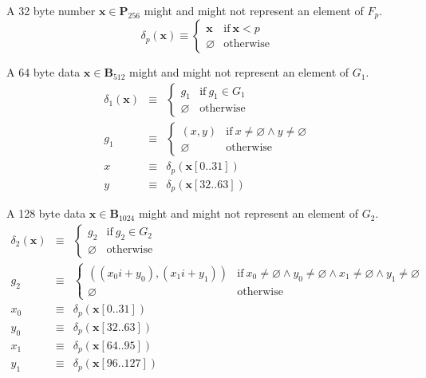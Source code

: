 \documentclass[9pt,oneside]{amsart}
\begin{document}
A 32 byte number $\mathbf{x}\in\mathbf{P}_{256}$ might and might not represent an element of $F_p$.
\begin{equation}
\delta_p(\mathbf x)\equiv\begin{cases}
\mathbf x&\text{if}\ \mathbf x<p\\
\varnothing&\text{otherwise}
\end{cases}
\end{equation}

A 64 byte data $\mathbf x\in\mathbf B_{512}$ might and might not represent an element of $G_1$.
\begin{eqnarray}
\delta_1(\mathbf x)&\equiv&\begin{cases}
g_1&\text{if}\ g_1\in G_1\\
\varnothing&\text{otherwise}
\end{cases}\\
g_1&\equiv&\begin{cases}
(x,y)&\text{if}\ x\neq\varnothing\wedge y\neq\varnothing\\
\varnothing&\text{otherwise}
\end{cases}\\
x&\equiv&\delta_p(\mathbf x[0..31])\\
y&\equiv&\delta_p(\mathbf x[32..63])
\end{eqnarray}

A 128 byte data $\mathbf x\in\mathbf B_{1024}$ might and might not represent an element of $G_2$.
\begin{eqnarray}
\delta_2(\mathbf x)&\equiv&\begin{cases}
g_2&\text{if}\ g_2\in G_2\\
\varnothing&\text{otherwise}
\end{cases}\\
g_2&\equiv&\begin{cases}
((x_0i+y_0),(x_1i+y_1))&\text{if}\ x_0\neq\varnothing\wedge y_0\neq\varnothing\wedge x_1\neq\varnothing\wedge y_1\neq\varnothing\\
\varnothing&\text{otherwise}
\end{cases}\\
x_0&\equiv&\delta_p(\mathbf x[0..31])\\
y_0&\equiv&\delta_p(\mathbf x[32..63])\\
x_1&\equiv&\delta_p(\mathbf x[64..95])\\
y_1&\equiv&\delta_p(\mathbf x[96..127])
\end{eqnarray}
\end{document}
